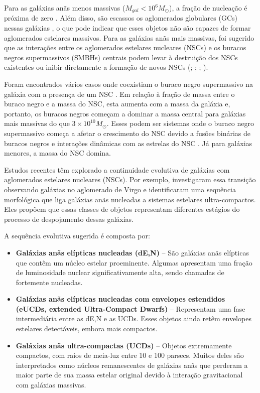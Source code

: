 Para as galáxias anãs menos massivas ($M_{gal} < 10^6 M_{\odot}$), a fração de nucleação é próxima de zero \citep{Ordenes_2018}. Além disso, são escassos os aglomerados globulares (GCs) nessas galáxias \citep{Forbes_2018}, o que pode indicar que esses objetos não são capazes de formar aglomerados estelares massivos. Para as galáxias anãs mais massivas, foi sugerido que as interações entre os aglomerados estelares nucleares (NSCs) e os buracos negros supermassivos (SMBHs) centrais podem levar à destruição dos NSCs existentes ou inibir diretamente a formação de novos NSCs (\citealp{Cote_2006}; \citealp{Neumayer_2012}; \citealp{Antonini_2015}; \citealp{Arca_2016}).

Foram encontrados vários casos onde coexistiam o buraco negro supermassivo na galáxia com a presença de um NSC \citep{Graham_2009}. Em relação à fração de massa entre o buraco negro e a massa do NSC, esta aumenta com a massa da galáxia e, portanto, os buracos negros começam a dominar a massa central para galáxias mais massivas do que $3 \times 10^{10} M_{\odot}$. Esses podem ser sistemas onde o buraco negro supermassivo começa a afetar o crescimento do NSC devido a fusões binárias de buracos negros e interações dinâmicas com as estrelas do NSC \citep{Antonini_2015}. Já para galáxias menores, a massa do NSC domina.

Estudos recentes têm explorado a continuidade evolutiva de galáxias com aglomerados estelares nucleares (NSCs). Por exemplo, \cite{Wang_2023} investigaram essa transição observando galáxias no aglomerado de Virgo e identificaram uma sequência morfológica que liga galáxias anãs nucleadas a sistemas estelares ultra-compactos. Eles propõem que essas classes de objetos representam diferentes estágios do processo de despojamento dessas galáxias.

\noindent A sequência evolutiva sugerida é composta por:

\begin{itemize}
    \item \textbf{Galáxias anãs elípticas nucleadas (dE,N)} – São galáxias anãs elípticas que contêm um núcleo estelar proeminente. Algumas apresentam uma fração de luminosidade nuclear significativamente alta, sendo chamadas de fortemente nucleadas.
    \item \textbf{Galáxias anãs elípticas nucleadas com envelopes estendidos (eUCDs, extended Ultra-Compact Dwarfs)} – Representam uma fase intermediária entre as dE,N e as UCDs. Esses objetos ainda retêm envelopes estelares detectáveis, embora mais compactos.
    \item \textbf{Galáxias anãs ultra-compactas (UCDs)} – Objetos extremamente compactos, com raios de meia-luz entre 10 e 100 parsecs. Muitos deles são interpretados como núcleos remanescentes de galáxias anãs que perderam a maior parte de sua massa estelar original devido à interação gravitacional com galáxias massivas.
\end{itemize}


